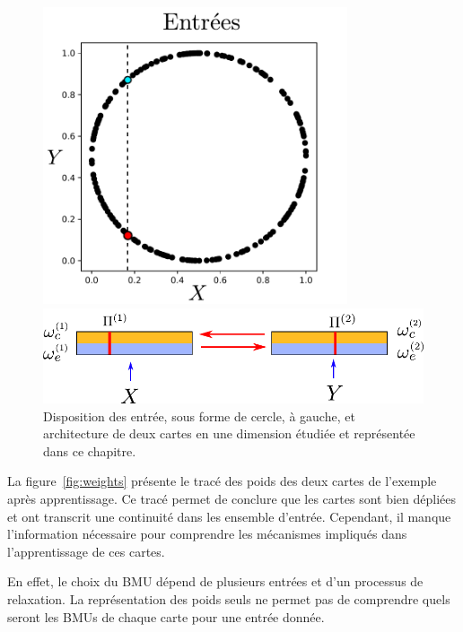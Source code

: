 \begin{figure}
\begin{minipage}{0.4\textwidth}
\centering
\includegraphics[width=0.8\textwidth]{2som_inp_noinformation}
\end{minipage}
\begin{minipage}{0.6\textwidth}
\includegraphics[width=\textwidth]{2som_archi}
\end{minipage}
\label{fig:exp}
\caption{Disposition des entrée, sous forme de cercle, à gauche, et architecture de deux cartes en une dimension étudiée et représentée dans ce chapitre.}
\end{figure}

La figure~\ref{fig:weights} présente le tracé des poids des deux cartes de l'exemple après apprentissage. Ce tracé permet de conclure que les cartes sont bien dépliées et ont transcrit une continuité dans les ensemble d'entrée. Cependant, il manque l'information nécessaire pour comprendre les mécanismes impliqués dans l'apprentissage de ces cartes.

En effet, le choix du BMU dépend de plusieurs entrées et d'un processus de relaxation. La représentation des poids seuls ne permet pas de comprendre quels seront les BMUs de chaque carte pour une entrée donnée. 


